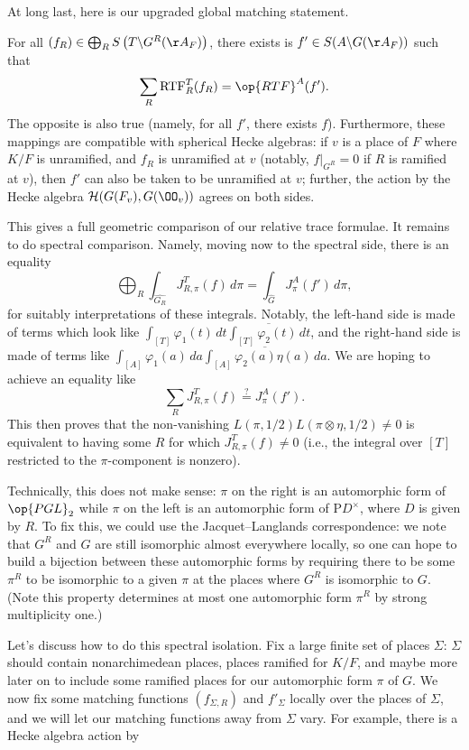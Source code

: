 \documentclass[../notes.tex]{subfiles}
\begin{document}
At long last, here is our upgraded global matching statement.
\begin{theorem}
	For all $(f_R)\in\bigoplus_RS\left(T\backslash G^R(\AA_F)\right)$, there exists is $f'\in S(A\backslash G(\AA_F))$ such that
	\[\sum_R\mathrm{RTF}_R^T(f_R)=\op{RTF}^A(f').\]
	The opposite is also true (namely, for all $f'$, there exists $f$). Furthermore, these mappings are compatible with spherical Hecke algebras: if $v$ is a place of $F$ where $K/F$ is unramified, and $f_R$ is unramified at $v$ (notably, $f|_{G^R}=0$ if $R$ is ramified at $v$), then $f'$ can also be taken to be unramified at $v$; further, the action by the Hecke algebra $\mathcal H(G(F_v),G(\OO_v))$ agrees on both sides.
\end{theorem}
This gives a full geometric comparison of our relative trace formulae. It remains to do spectral comparison. Namely, moving now to the spectral side, there is an equality
\[\bigoplus_R\int_{\widehat{G_R}}J^T_{R,\pi}(f)\,d\pi=\int_{\widehat G}J_\pi^A(f')\,d\pi,\]
for suitably interpretations of these integrals. Notably, the left-hand side is made of terms which look like $\int_{[T]}\varphi_1(t)\,dt\overline{\int_{[T]}\varphi_2(t)\,dt}$, and the right-hand side is made of terms like $\int_{[A]}\varphi_1(a)\,da\overline{\int_{[A]}\varphi_2(a)\eta(a)\,da}$. We are hoping to achieve an equality like
\[\sum_RJ^T_{R,\pi}(f)\stackrel?=J_\pi^A(f').\]
This then proves that the non-vanishing $L(\pi,1/2)L(\pi\otimes\eta,1/2)\ne0$ is equivalent to having some $R$ for which $J_{R,\pi}^T(f)\ne0$ (i.e., the integral over $[T]$ restricted to the $\pi$-component is nonzero).
\begin{remark}
	Technically, this does not make sense: $\pi$ on the right is an automorphic form of $\op{PGL}_2$ while $\pi$ on the left is an automorphic form of $\mathrm PD^\times$, where $D$ is given by $R$. To fix this, we could use the Jacquet--Langlands correspondence: we note that $G^R$ and $G$ are still isomorphic almost everywhere locally, so one can hope to build a bijection between these automorphic forms by requiring there to be some $\pi^R$ to be isomorphic to a given $\pi$ at the places where $G^R$ is isomorphic to $G$. (Note this property determines at most one automorphic form $\pi^R$ by strong multiplicity one.)
\end{remark}
Let's discuss how to do this spectral isolation. Fix a large finite set of places $\Sigma$: $\Sigma$ should contain nonarchimedean places, places ramified for $K/F$, and maybe more later on to include some ramified places for our automorphic form $\pi$ of $G$. We now fix some matching functions $(f_{\Sigma,R})$ and $f'_\Sigma$ locally over the places of $\Sigma$, and we will let our matching functions away from $\Sigma$ vary. For example, there is a Hecke algebra action by
\end{document}

